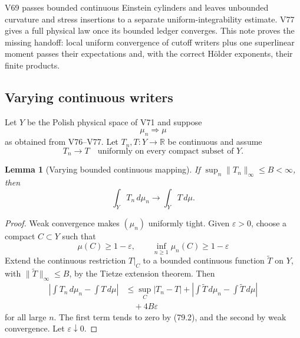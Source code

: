 \documentclass[11pt]{article}
\newtheorem{lemma}[theorem]{Lemma}
\theoremstyle{remark}
\begin{document}
V69 passes bounded continuous Einstein cylinders and leaves
unbounded curvature and stress insertions to a separate
uniform-integrability estimate.  V77 gives a full physical law once
its bounded ledger converges.  This note proves the missing handoff:
local uniform convergence of cutoff writers plus one
superlinear moment passes their expectations and, with the correct
Hölder exponents, their finite products.

\subsection{Varying continuous writers}

Let \(Y\) be the Polish physical space of V71 and suppose
\[
                              \mu_n\Rightarrow\mu             \tag{79.1}
\]
as obtained from V76--V77.  Let
\(T_n,T:Y\to\mathbb R\) be continuous and assume
\begin{equation}
 T_n\longrightarrow T
 \quad\text{uniformly on every compact subset of }Y.         \tag{79.2}
\end{equation}

\begin{lemma}[Varying bounded continuous mapping]
\label{lem:v12v79-bounded}
If \(\sup_n\|T_n\|_\infty\leq B<\infty\), then
\begin{equation}
                         \int_YT_n\,d\mu_n
                         \longrightarrow\int_YT\,d\mu.       \tag{79.3}
\end{equation}
\end{lemma}

\begin{proof}
Weak convergence makes \((\mu_n)\) uniformly tight.  Given
\(\varepsilon>0\), choose a compact \(C\subset Y\) such that
\[
 \mu(C)\geq1-\varepsilon,\qquad
 \inf_{n\geq1}\mu_n(C)\geq1-\varepsilon
\]
Extend the continuous restriction
\(T|_C\) to a bounded continuous function
\(\widetilde T\) on \(Y\), with
\(\|\widetilde T\|_\infty\leq B\), by the Tietze extension theorem.
Then
\[
 \begin{split}
 \left|\int T_n\,d\mu_n-\int T\,d\mu\right|
 &\leq
 \sup_C|T_n-T|
 +\left|\int\widetilde T\,d\mu_n
              -\int\widetilde T\,d\mu\right|\\
 &\quad+4B\varepsilon
 \end{split}                                                \tag{79.4}
\]
for all large \(n\).  The first term tends to zero by (79.2), and
the second by weak convergence.  Let \(\varepsilon\downarrow0\).
\end{proof}
\end{document}
